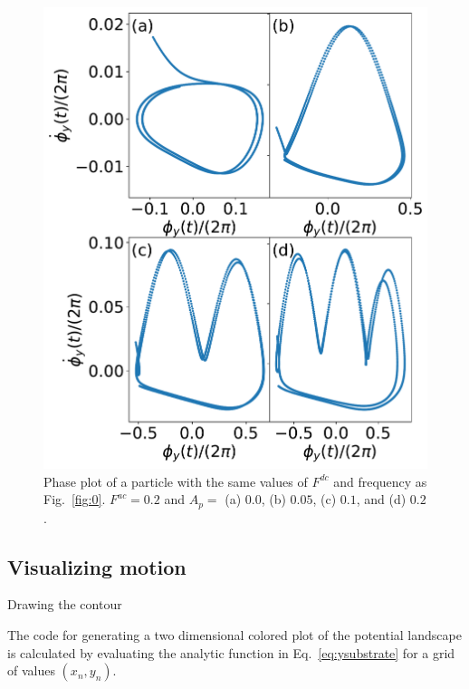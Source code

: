 \documentclass[twocolumn,preprintnumbers,amsmath,amssymb,aps,prx]{revtex4}
\begin{document}
  
  \begin{center}
    \begin{figure}[h!]
      \centering
      \includegraphics[width=\columnwidth]{phase.pdf}
      \caption{
        Phase plot of a particle with the same values of $F^{dc}$ and frequency as Fig.~\ref{fig:0}.  $F^{ac} = 0.2$ and $A_p = $ (a) $0.0$, (b) $0.05$, (c) $0.1$, and (d) $0.2$.
      }
      \label{fig:phase}
    \end{figure}
  \end{center}

  
  \subsection{Visualizing motion}
  \label{ex:animation}
  
  Drawing the contour 

  The code for generating
  a two dimensional colored plot
  of the potential landscape
  is calculated by evaluating
  the analytic function in Eq.~\ref{eq:ysubstrate}
  for a grid of values $(x_n,y_n)$.
\end{document}
